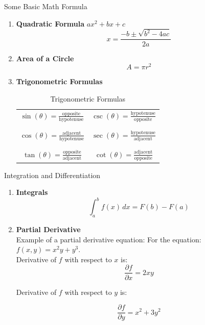 \documentclass[12pt]{beamer}
\begin{document}
\begin{frame}{Some Basic Math Formula}
\begin{enumerate}
    \item \textbf{Quadratic Formula} $ax^2+bx+c$
    $$ x = \frac{-b \pm \sqrt{b^2 - 4ac}}{2a} $$
    \item \textbf{Area of a Circle}
    $$A = \pi r^2$$
    \item \textbf{Trigonometric Formulas}
    \begin{table}[h]
        \centering
        \begin{tabular}{c|c}
        
            \(\sin(\theta) = \frac{\text{opposite}}{\text{hypotenuse}}\) & \(\csc(\theta) = \frac{\text{hypotenuse}}{\text{opposite}}\)  \\ \\ \hline \\
            \(\cos(\theta) = \frac{\text{adjacent}}{\text{hypotenuse}}\) & \(\sec(\theta) = \frac{\text{hypotenuse}}{\text{adjacent}}\) \\ \\ \hline \\
            \(\tan(\theta) = \frac{\text{opposite}}{\text{adjacent}}\) & \(\cot(\theta) = \frac{\text{adjacent}}{\text{opposite}}\) \\
        \end{tabular}
        \caption{Trigonometric Formulas}
    \end{table}
\end{enumerate}
\end{frame}
\begin{frame}{Integration and Differentiation}
\begin {enumerate}
    \item \textbf{Integrals}
    $$\int_a^b f(x) \, dx = F(b) - F(a)$$
    \item \textbf{Partial Derivative}
     \\Example of a partial derivative equation: For the equation:
     \\\( f(x, y) = x^2 y + y^3 \).
     \\Derivative of \( f \) with respect to \( x \) is:
    \begin{equation}\frac{\partial f}{\partial x} = 2xy\end{equation}
    
    Derivative of \( f \) with respect to \( y \) is:

    \begin{equation}\frac{\partial f}{\partial y} = x^2 + 3y^2\end{equation}
\end {enumerate}
\end{frame}
\end{document}
